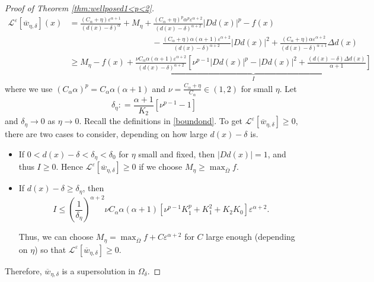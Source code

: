 \documentclass[12pt,reqno]{amsart}
\numberwithin{figure}{section}
\theoremstyle{plain}
\theoremstyle{remark}
\numberwithin{equation}{section}
\begin{document}
\begin{appendices}
\begin{proof} [Proof of Theorem \ref{thm:wellposed1<p<2}]
\begin{align*}
    \mathcal{L}^\varepsilon\left[\overline{w}_{\eta,\delta}\right](x) &= \frac{ (C_\alpha + \eta)\varepsilon^{\alpha+1}}{(d(x)-\delta)^\alpha} + M_\eta + \frac{(C_\alpha+\eta)^p \alpha^p\varepsilon^{\alpha+2}}{(d(x)-\delta)^{\alpha+2}}|D d(x)|^p - f(x) \\
    & \qquad\qquad\qquad\qquad\qquad - \frac{(C_\alpha+\eta)\alpha(\alpha+1)\varepsilon^{\alpha+2}}{(d(x)-\delta)^{\alpha+2}}|D d(x)|^2 + \frac{(C_\alpha+\eta)\alpha \varepsilon^{\alpha+2}}{(d(x)-\delta)^{\alpha+1}}\Delta d(x)\\
    &\geq M_\eta - f(x) + \underbrace{\frac{\nu C_\alpha\alpha(\alpha+1)\varepsilon^{\alpha+2}}{(d(x)-\delta)^{\alpha+2}}\left[\nu^{p-1}|Dd(x)|^{p} - |Dd(x)|^2 + \frac{(d(x)-\delta)\Delta d(x)}{\alpha+1}\right]}_{I}
\end{align*}
where we use $(C_\alpha\alpha)^p = C_\alpha\alpha(\alpha+1)$ and $\nu = \frac{C_\alpha+\eta}{C_\alpha} \in (1,2)$ for small $\eta$. Let
\begin{equation*}
    \delta_\eta : = \frac{\alpha+1}{K_2}\left[\nu^{p-1}-1\right]
\end{equation*}
and $\delta_\eta \to 0$ as $\eta \to 0$.
Recall the definitions in \eqref{boundond}. To get  $\mathcal{L}^\varepsilon\left[\overline{w}_{\eta,\delta}\right]\geq 0$, there are two cases to consider, depending on how large $d(x)-\delta$ is.
\begin{itemize}
    \item If $0< d(x)-\delta <\delta_\eta < \delta_0$ for $\eta$ small and fixed, then $|Dd(x)| = 1$, and thus $I\geq 0$. Hence $\mathcal{L}^\varepsilon\left[\overline{w}_{\eta,\delta}\right]\geq 0$ if we choose $M_\eta \geq \max_{\overline{\Omega}} f$.
    \item If $d(x)-\delta\geq \delta_\eta$, then 
    \begin{equation*}
        I \leq \left(\frac{1}{\delta_\eta}\right)^{\alpha+2}\nu C_\alpha \alpha(\alpha+1)\left[\nu^{p-1}K_1^{p}+K_1^2+K_2K_0\right]\varepsilon^{\alpha+2}.
    \end{equation*}
    
    Thus, we can choose $M_\eta = \max_{\overline{\Omega}} f + C\varepsilon^{\alpha+2}$ for $C$ large enough (depending on $\eta$) so that  $\mathcal{L}^\varepsilon\left[\overline{w}_{\eta,\delta}\right]\geq 0$.
\end{itemize}
Therefore, $\overline{w}_{\eta,\delta}$ is a supersolution in $\Omega_\delta$. 


\end{proof}
\end{appendices}
\end{document}
